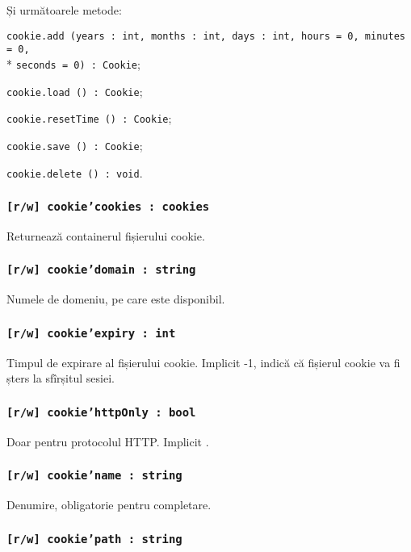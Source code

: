 Și următoarele metode:
\begin{icItems}
	\item \texttt{cookie.add (years : int, months : int, days : int, hours = 0, minutes = 0,}\\* \texttt{seconds = 0) : Cookie};
	\item \texttt{cookie.load () : Cookie};
	\item \texttt{cookie.resetTime () : Cookie};
	\item \texttt{cookie.save () : Cookie};
	\item \texttt{cookie.delete () : void}.
\end{icItems}

\subsubsection{\texttt{[r/w] cookie'cookies : cookies}}

Returnează containerul fișierului cookie.

\subsubsection{\texttt{[r/w] cookie'domain : string}}

Numele de domeniu, pe care \cookie{} este disponibil.

\subsubsection{\texttt{[r/w] cookie'expiry : int}}

Timpul de expirare al fișierului cookie. Implicit -1, indică că fișierul cookie va fi șters la sfîrșitul sesiei.

\subsubsection{\texttt{[r/w] cookie'httpOnly : bool}}

Doar pentru protocolul HTTP. Implicit \false.

\subsubsection{\texttt{[r/w] cookie'name : string}}

Denumire, obligatorie pentru completare.

\subsubsection{\texttt{[r/w] cookie'path : string}}

